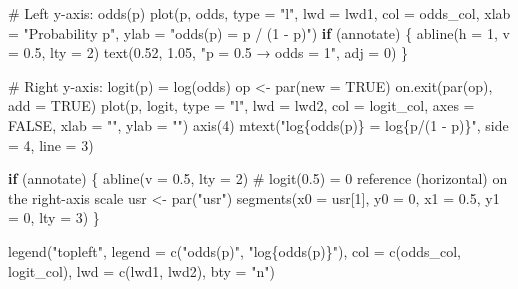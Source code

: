 \documentclass[
  letterpaper,
  DIV=11,
  numbers=noendperiod]{scrreprt}
\newenvironment{Shaded}{\begin{snugshade}}{\end{snugshade}}
\newcommand{\AttributeTok}[1]{\textcolor[rgb]{0.40,0.45,0.13}{#1}}
\newcommand{\CommentTok}[1]{\textcolor[rgb]{0.37,0.37,0.37}{#1}}
\newcommand{\ConstantTok}[1]{\textcolor[rgb]{0.56,0.35,0.01}{#1}}
\newcommand{\ControlFlowTok}[1]{\textcolor[rgb]{0.00,0.23,0.31}{\textbf{#1}}}
\newcommand{\DecValTok}[1]{\textcolor[rgb]{0.68,0.00,0.00}{#1}}
\newcommand{\FloatTok}[1]{\textcolor[rgb]{0.68,0.00,0.00}{#1}}
\newcommand{\FunctionTok}[1]{\textcolor[rgb]{0.28,0.35,0.67}{#1}}
\newcommand{\NormalTok}[1]{\textcolor[rgb]{0.00,0.23,0.31}{#1}}
\newcommand{\OtherTok}[1]{\textcolor[rgb]{0.00,0.23,0.31}{#1}}
\newcommand{\StringTok}[1]{\textcolor[rgb]{0.13,0.47,0.30}{#1}}
\begin{document}
\begin{Shaded}
\begin{Highlighting}[]
  \CommentTok{\# Left y{-}axis: odds(p)}
  \FunctionTok{plot}\NormalTok{(p, odds, }\AttributeTok{type =} \StringTok{"l"}\NormalTok{, }\AttributeTok{lwd =}\NormalTok{ lwd1, }\AttributeTok{col =}\NormalTok{ odds\_col,}
       \AttributeTok{xlab =} \StringTok{"Probability p"}\NormalTok{,}
       \AttributeTok{ylab =} \StringTok{"odds(p) = p / (1 {-} p)"}\NormalTok{)}
  \ControlFlowTok{if}\NormalTok{ (annotate) \{}
    \FunctionTok{abline}\NormalTok{(}\AttributeTok{h =} \DecValTok{1}\NormalTok{, }\AttributeTok{v =} \FloatTok{0.5}\NormalTok{, }\AttributeTok{lty =} \DecValTok{2}\NormalTok{)}
    \FunctionTok{text}\NormalTok{(}\FloatTok{0.52}\NormalTok{, }\FloatTok{1.05}\NormalTok{, }\StringTok{"p = 0.5 → odds = 1"}\NormalTok{, }\AttributeTok{adj =} \DecValTok{0}\NormalTok{)}
\NormalTok{  \}}

  \CommentTok{\# Right y{-}axis: logit(p) = log(odds)}
\NormalTok{  op }\OtherTok{\textless{}{-}} \FunctionTok{par}\NormalTok{(}\AttributeTok{new =} \ConstantTok{TRUE}\NormalTok{)}
  \FunctionTok{on.exit}\NormalTok{(}\FunctionTok{par}\NormalTok{(op), }\AttributeTok{add =} \ConstantTok{TRUE}\NormalTok{)}
  \FunctionTok{plot}\NormalTok{(p, logit, }\AttributeTok{type =} \StringTok{"l"}\NormalTok{, }\AttributeTok{lwd =}\NormalTok{ lwd2, }\AttributeTok{col =}\NormalTok{ logit\_col,}
       \AttributeTok{axes =} \ConstantTok{FALSE}\NormalTok{, }\AttributeTok{xlab =} \StringTok{""}\NormalTok{, }\AttributeTok{ylab =} \StringTok{""}\NormalTok{)}
  \FunctionTok{axis}\NormalTok{(}\DecValTok{4}\NormalTok{)}
  \FunctionTok{mtext}\NormalTok{(}\StringTok{"log\{odds(p)\} = log\{p/(1 {-} p)\}"}\NormalTok{, }\AttributeTok{side =} \DecValTok{4}\NormalTok{, }\AttributeTok{line =} \DecValTok{3}\NormalTok{)}

  \ControlFlowTok{if}\NormalTok{ (annotate) \{}
    \FunctionTok{abline}\NormalTok{(}\AttributeTok{v =} \FloatTok{0.5}\NormalTok{, }\AttributeTok{lty =} \DecValTok{2}\NormalTok{)}
    \CommentTok{\# logit(0.5) = 0 reference (horizontal) on the right{-}axis scale}
\NormalTok{    usr }\OtherTok{\textless{}{-}} \FunctionTok{par}\NormalTok{(}\StringTok{"usr"}\NormalTok{)}
    \FunctionTok{segments}\NormalTok{(}\AttributeTok{x0 =}\NormalTok{ usr[}\DecValTok{1}\NormalTok{], }\AttributeTok{y0 =} \DecValTok{0}\NormalTok{, }\AttributeTok{x1 =} \FloatTok{0.5}\NormalTok{, }\AttributeTok{y1 =} \DecValTok{0}\NormalTok{, }\AttributeTok{lty =} \DecValTok{3}\NormalTok{)}
\NormalTok{  \}}

  \FunctionTok{legend}\NormalTok{(}\StringTok{"topleft"}\NormalTok{,}
         \AttributeTok{legend =} \FunctionTok{c}\NormalTok{(}\StringTok{"odds(p)"}\NormalTok{, }\StringTok{"log\{odds(p)\}"}\NormalTok{),}
         \AttributeTok{col =} \FunctionTok{c}\NormalTok{(odds\_col, logit\_col),}
         \AttributeTok{lwd =} \FunctionTok{c}\NormalTok{(lwd1, lwd2), }\AttributeTok{bty =} \StringTok{"n"}\NormalTok{)}


\end{Highlighting}
\end{Shaded}
\end{document}
